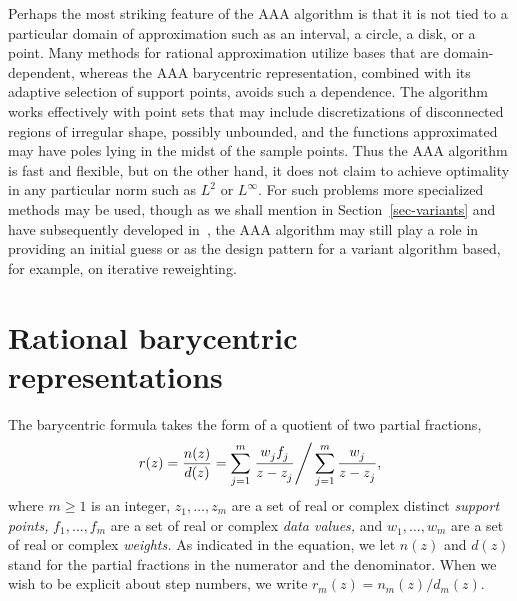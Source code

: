 \documentclass[final]{siamltex}
\begin{document}
Perhaps the most striking feature of the AAA algorithm is that
it is not tied to a particular domain of approximation such as
an interval, a circle, a disk, or a point.  Many methods for
rational approximation utilize bases that are domain-dependent,
whereas the AAA barycentric representation, combined with its
adaptive selection of support points, avoids such a dependence.
The algorithm works effectively with point sets that may include
discretizations of disconnected regions of irregular shape,
possibly unbounded, and the functions approximated may have poles
lying in the midst of the sample points.  Thus the AAA algorithm
is fast and flexible, but on the other hand, it does not claim
to achieve optimality in any particular norm such as $L^2$ or
$L^\infty$.  For such problems more specialized methods may be
used, though as we shall mention in Section~\ref{sec-variants} and
have subsequently developed in~\cite{fntb}, the AAA algorithm may
still play a role in providing an initial guess or as the design pattern
for a variant algorithm based, for example, on iterative reweighting.

\section{\label{algebra}Rational barycentric representations}
The barycentric formula takes the form
of a quotient of two partial fractions,
\begin{equation}
r(z) = {n(z)\over d(z)} = {\sum_{j=1}^m \left. {w_j^{} f_j^{}\over z- z_j^{}} \right/
\sum_{j=1}^m  {w_j^{} \over z- z_j^{}}},
\label{bary}
\end{equation}
where $m\ge 1$ is an integer, $z_1^{},\dots,z_m^{}$ are
a set of real or complex distinct {\em support points,}
$f_1^{},\dots,f_m^{}$ are a set of real or complex {\em data
values,} and $w_1^{},\dots,w_m^{}$ are a set of real or complex
{\em weights.}  As indicated in the equation, we let $n(z)$
and $d(z)$ stand for the partial fractions in the numerator and
the denominator.  When we wish to be explicit about step numbers,
we write $r_m^{}(z)= n_m^{}(z)/d_m^{}(z)$.
\end{document}
